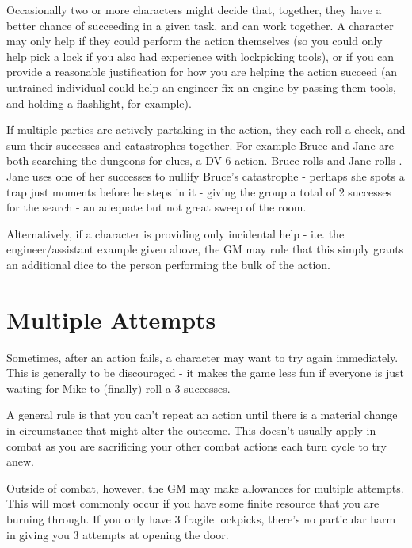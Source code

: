 Occasionally two or more characters might decide that, together, they have a better chance of succeeding in a given task, and can work together. A character may only help if they could perform the action themselves (so you could only help pick a lock if you also had experience with lockpicking tools), or if you can provide a reasonable justification for how you are helping the action succeed (an untrained individual could help an engineer fix an engine by passing them tools, and holding a flashlight, for example). 

If multiple parties are actively partaking in the action, they each roll a check, and sum their successes and catastrophes together. For example Bruce and Jane are both searching the dungeons for clues, a DV 6 action. Bruce rolls  and Jane rolls . Jane uses one of her successes to nullify Bruce's catastrophe - perhaps she spots a trap just moments before he steps in it - giving the group a total of 2 successes for the search - an adequate but not great sweep of the room. 

Alternatively, if a character is providing only incidental help - i.e. the engineer/assistant example given above, the GM may rule that this simply grants an additional dice to the person performing the bulk of the action.


\section{Multiple Attempts}

Sometimes, after an action fails, a character may want to try again immediately. This is generally to be discouraged - it makes the game less fun if everyone is just waiting for Mike to (finally) roll a 3 successes. 

A general rule is that you can't repeat an action until there is a material change in circumstance that might alter the outcome. This doesn't usually apply in combat as you are sacrificing your other combat actions each turn cycle to try anew. 

Outside of combat, however, the GM may make allowances for multiple attempts. This will most commonly occur if you have some finite resource that you are burning through. If you only have 3 fragile lockpicks, there's no particular harm in giving you 3 attempts at opening the door. 


